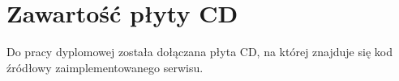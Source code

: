 \chapter{Zawartość płyty CD}
\thispagestyle{chapterBeginStyle}
\label{plytaCD}

Do pracy dyplomowej została dołączana płyta CD, na której znajduje się kod źródłowy zaimplementowanego serwisu.

